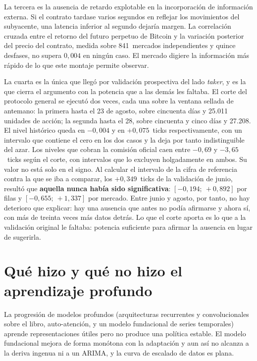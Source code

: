 La tercera es la ausencia de retardo explotable en la incorporación de información externa.
Si el contrato tardase varios segundos en reflejar los movimientos del subyacente, una
latencia inferior al segundo dejaría margen. La correlación cruzada entre el retorno del
futuro perpetuo de Bitcoin y la variación posterior del precio del contrato, medida sobre
841~mercados independientes y quince desfases, no supera $0{,}004$ en ningún caso. El
mercado digiere la información más rápido de lo que este montaje permite observar.

La cuarta es la única que llegó por validación prospectiva del lado \emph{taker}, y es la
que cierra el argumento con la potencia que a las demás les faltaba. El corte del protocolo general se ejecutó dos veces, cada una sobre la ventana
sellada de antemano: la primera hasta el 23 de agosto, sobre cincuenta días y 25.011
unidades de acción; la segunda hasta el 28, sobre cincuenta y cinco días y 27.208. El nivel
histórico queda en $-0{,}004$ y en $+0{,}075$~ticks respectivamente, con un intervalo que
contiene el cero en los dos casos y la deja por tanto indistinguible del azar. Los niveles
que cobran la comisión oficial caen entre $-0{,}69$ y $-3{,}65$~ticks según el corte, con
intervalos que lo excluyen holgadamente en ambos. Su valor no
está solo en el signo. Al calcular el intervalo de la cifra de referencia contra la que
se iba a comparar, los $+0{,}349$~ticks de la validación de junio, resultó que
\textbf{aquella nunca había sido significativa}: $[-0{,}194;\ +0{,}892]$ por filas y
$[-0{,}655;\ +1{,}337]$ por mercado. Entre junio y agosto, por tanto, no hay deterioro que explicar: hay una ausencia que
antes no podía afirmarse y ahora sí, con más de treinta veces más datos detrás. Lo que el corte aporta es lo que a la validación
original le faltaba: potencia suficiente para afirmar la ausencia en lugar de sugerirla.

\section{Qué hizo y qué no hizo el aprendizaje profundo}

La progresión de modelos profundos (arquitecturas recurrentes y convolucionales sobre el
libro, auto-atención, y un modelo fundacional de series temporales) aprende
representaciones útiles pero no produce una política estable. El modelo fundacional mejora
de forma monótona con la adaptación y aun así no alcanza a la deriva ingenua ni a un ARIMA,
y la curva de escalado de datos es plana.

